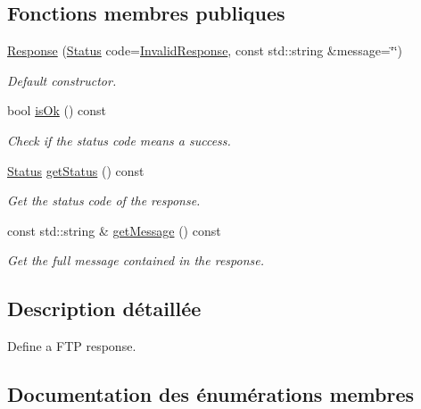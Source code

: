 \subsection*{Fonctions membres publiques}
\begin{DoxyCompactItemize}
\item 
\hyperlink{classsf_1_1Ftp_1_1Response_af300fffd4862774102f978eb22f85d9b}{Response} (\hyperlink{classsf_1_1Ftp_1_1Response_af81738f06b6f571761696291276acb3b}{Status} code=\hyperlink{classsf_1_1Ftp_1_1Response_af81738f06b6f571761696291276acb3ba59e041e4ef186e8ae8d6035973fc46bd}{Invalid\+Response}, const std\+::string \&message=\char`\"{}\char`\"{})
\begin{DoxyCompactList}\small\item\em Default constructor. \end{DoxyCompactList}\item 
bool \hyperlink{classsf_1_1Ftp_1_1Response_a5102552955a2652c1a39e9046e617b36}{is\+Ok} () const
\begin{DoxyCompactList}\small\item\em Check if the status code means a success. \end{DoxyCompactList}\item 
\hyperlink{classsf_1_1Ftp_1_1Response_af81738f06b6f571761696291276acb3b}{Status} \hyperlink{classsf_1_1Ftp_1_1Response_a52bbca9fbf5451157bc055e3d8430c25}{get\+Status} () const
\begin{DoxyCompactList}\small\item\em Get the status code of the response. \end{DoxyCompactList}\item 
const std\+::string \& \hyperlink{classsf_1_1Ftp_1_1Response_a4af82a0b3620c90558390e1f600abc05}{get\+Message} () const
\begin{DoxyCompactList}\small\item\em Get the full message contained in the response. \end{DoxyCompactList}\end{DoxyCompactItemize}


\subsection{Description détaillée}
Define a F\+TP response. 

\subsection{Documentation des énumérations membres}
\mbox{\label{classsf_1_1Ftp_1_1Response_af81738f06b6f571761696291276acb3b}} 

